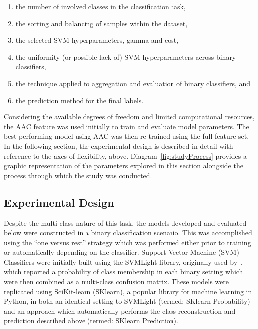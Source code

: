 \begin{enumerate}
\item the number of involved classes in the classification task,
\item the sorting and balancing of samples within the dataset,
\item the selected SVM hyperparameters, gamma and cost,
\item the uniformity (or possible lack of) SVM hyperparameters across binary classifiers,
\item the technique applied to aggregation and evaluation of binary classifiers, and
\item the prediction method for the final labels.
\end{enumerate}

Considering the available degrees of freedom and limited computational resources, the AAC feature was used initially
to train and evaluate model parameters. The best performing model using AAC was then re-trained using the full feature
set. In the following section, the experimental design is described in detail with reference to the axes of flexibility,
above. Diagram~\ref{fig:studyProcess} provides a graphic representation of the parameters explored in this
section alongside the process through which the study was conducted.

\subsection{Experimental Design}
\label{sec:experimentaldesign}
Despite the multi-class nature of this task, the models developed and evaluated below were constructed in a binary
classification scenario. This was accomplished using the ``one versus rest'' strategy which was performed either prior
to training or automatically depending on the classifier. Support Vector Machine (SVM) Classifiers were initially built
using the SVMLight library, originally used by~\cite{mishra2014prediction}, which reported a probability of class
membership in each binary setting which were then combined as a multi-class confusion matrix. These models were
replicated using SciKit-learn (SKlearn), a popular library for machine learning in Python, in both an identical setting
to SVMLight (termed: SKlearn Probability) and an approach which automatically performs the class reconstruction and
prediction described above (termed: SKlearn Prediction). 

